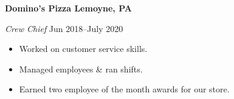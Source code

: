 \textbf{Domino's Pizza \hfill  Lemoyne, PA} \par
\textit{Crew Chief} \hfill Jun 2018--July 2020 \par
\begin{itemize}
	\item Worked on customer service skills.
	\item Managed employees \& ran shifts.
	\item Earned two employee of the month awards for our store.
\end{itemize} \par
